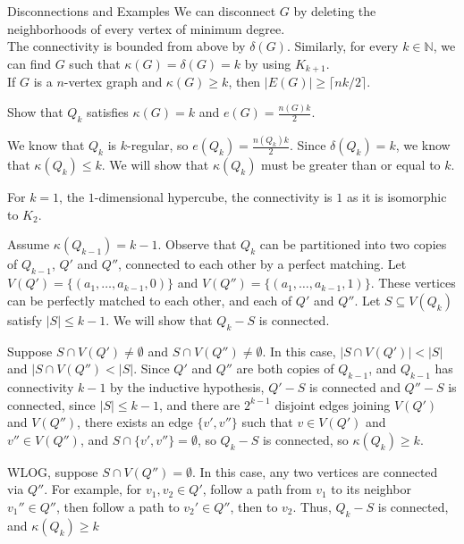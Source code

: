 \documentclass[10pt]{extarticle}
\begin{document}
  \begin{problem}{Disconnections and Examples}
    We can disconnect $G$ by deleting the neighborhoods of every vertex of minimum degree.\\

    The connectivity is bounded from above by $\delta(G)$. Similarly, for every $k\in \mathbb{N}$, we can find $G$ such that $\kappa(G) = \delta(G) = k$ by using $K_{k+1}$.\\

    If $G$ is a $n$-vertex graph and $\kappa(G) \geq k$, then $|E(G)| \geq \lceil nk/2\rceil$.\\

    \begin{description}[font=\scshape]
      \item[Ex.] Show that $Q_k$ satisfies $\kappa(G) = k$ and $e(G) = \frac{n(G)k}{2}$.
      \item[Proof] We know that $Q_k$ is $k$-regular, so $e(Q_k) = \frac{n(Q_k)k}{2}$. Since $\delta(Q_k) = k$, we know that $\kappa(Q_k)\leq k$. We will show that $\kappa(Q_k)$ must be greater than or equal to $k$.
        \begin{description}[font=\normalfont\scshape]
          \item[Base Case] For $k = 1$, the $1$-dimensional hypercube, the connectivity is $1$ as it is isomorphic to $K_2$.
          \item[Inductive Hypothesis] Assume $\kappa(Q_{k - 1}) = k-1$. Observe that $Q_k$ can be partitioned into two copies of $Q_{k-1}$, $Q'$ and $Q''$, connected to each other by a perfect matching. Let $V(Q') = \{(a_1,\dots,a_{k-1},0)\}$ and $V(Q'') = \{(a_1,\dots,a_{k-1},1)\}$. These vertices can be perfectly matched to each other, and each of $Q'$ and $Q''$. Let $S\subseteq V(Q_k)$ satisfy $|S| \leq k-1$. We will show that $Q_k-S$ is connected.
            \begin{description}[font=\normalfont\scshape]
              \item[Case 1] Suppose $S\cap V(Q') \neq \emptyset$ and $S\cap V(Q'') \neq \emptyset$. In this case, $|S \cap V(Q')| < |S|$ and $|S\cap V(Q'') < |S|$. Since $Q'$ and $Q''$ are both copies of $Q_{k-1}$, and $Q_{k-1}$ has connectivity $k-1$ by the inductive hypothesis, $Q'-S$ is connected and $Q'' - S$ is connected, since $|S| \leq k-1$, and there are $2^{k-1}$ disjoint edges joining $V(Q')$ and $V(Q'')$, there exists an edge $\{v',v''\}$ such that $v\in V(Q')$ and $v''\in V(Q'')$, and $S\cap \{v',v''\} = \emptyset$, so $Q_k-S$ is connected, so $\kappa(Q_k) \geq k$.
              \item[Case 2] WLOG, suppose $S\cap V(Q'') = \emptyset$. In this case, any two vertices are connected via $Q''$. For example, for $v_1, v_2\in Q'$, follow a path from $v_1$ to its neighbor $v_1''\in Q''$, then follow a path to $v_2'\in Q''$, then to $v_2$. Thus, $Q_k-S$ is connected, and $\kappa(Q_k) \geq k$
            \end{description}
        \end{description}
    \end{description}
  \end{problem}
\end{document}
